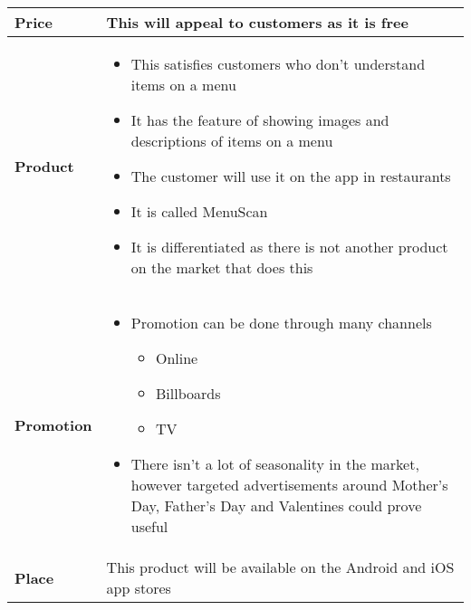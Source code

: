 \documentclass{article}[18pt]
\begin{document}
\begin{center}
{\renewcommand{\arraystretch}{2}
\begin{tabular}{| m{0.2\linewidth} |m{0.8\linewidth}|}
\hline
\textbf{Price}&This will appeal to customers as it is free\\
\hline
\textbf{Product}&
\begin{itemize}
	\item This satisfies customers who don't understand items on a menu
	\item It has the feature of showing images and descriptions of items on a menu
	\item The customer will use it on the app in restaurants
	\item It is called MenuScan
	\item It is differentiated as there is not another product on the market that does this
\end{itemize}\\
\hline
\textbf{Promotion}&
\begin{itemize}
	\item Promotion can be done through many channels
	\begin{itemize}
		\item Online
		\item Billboards
		\item TV
	\end{itemize}
	\item There isn't a lot of seasonality in the market, however targeted advertisements around Mother's Day, Father's Day and Valentines could prove useful
\end{itemize}\\
\hline
\textbf{Place}& This product will be available on the Android and iOS app stores\\
\hline
\end{tabular}}
\end{center}
\end{document}
